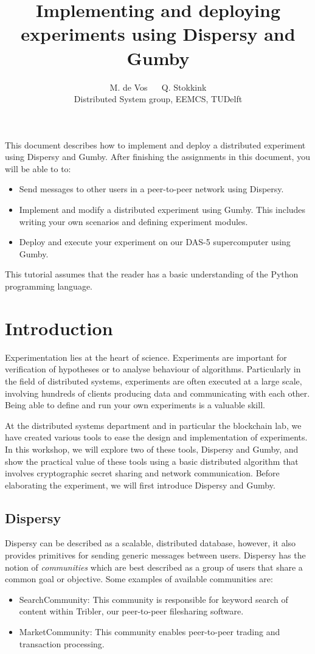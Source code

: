 \documentclass{article}
\author{
  M. de Vos $\quad$
  Q. Stokkink\\
  \small Distributed System group, EEMCS, TUDelft
}
\title{Implementing and deploying experiments using Dispersy and Gumby}
\begin{document}
\maketitle

This document describes how to implement and deploy a distributed experiment using Dispersy and Gumby.
After finishing the assignments in this document, you will be able to to:
\begin{itemize}
	\item Send messages to other users in a peer-to-peer network using Dispersy.
	\item Implement and modify a distributed experiment using Gumby. This includes writing your own scenarios and defining experiment modules.
	\item Deploy and execute your experiment on our DAS-5 supercomputer using Gumby.
\end{itemize}

This tutorial assumes that the reader has a basic understanding of the Python programming language.

\section{Introduction}
Experimentation lies at the heart of science. Experiments are important for verification of hypotheses or to analyse behaviour of algorithms.
Particularly in the field of distributed systems, experiments are often executed at a large scale, involving hundreds of clients producing data and communicating with each other.
Being able to define and run your own experiments is a valuable skill.

At the distributed systems department and in particular the blockchain lab, we have created various tools to ease the design and implementation of experiments. In this workshop, we will explore two of these tools, Dispersy and Gumby, and show the practical value of these tools using a basic distributed algorithm that involves cryptographic secret sharing and network communication.
Before elaborating the experiment, we will first introduce Dispersy and Gumby.

\subsection{Dispersy}
Dispersy can be described as a scalable, distributed database, however, it also provides primitives for sending generic messages between users.
Dispersy has the notion of \emph{communities} which are best described as a group of users that share a common goal or objective.
Some examples of available communities are:
\begin{itemize}
	\item SearchCommunity: This community is responsible for keyword search of content within Tribler, our peer-to-peer filesharing software.
	\item MarketCommunity: This community enables peer-to-peer trading and transaction processing.
\end{itemize}
\end{document}
